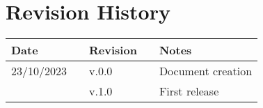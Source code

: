 \chapter*{Revision History}

\begin{table}[h]
    \centering
    \begin{tabular}{l p{2.5cm} l p{2.5cm} l}
        \hline
        \textbf{Date} & & \textbf{Revision} & & \textbf{Notes}          \\ \hline
        23/10/2023    & & v.0.0             & & Document creation       \\
                      & & v.1.0             & & First release           \\ \hline                         
    \end{tabular}
\end{table}

\newpage